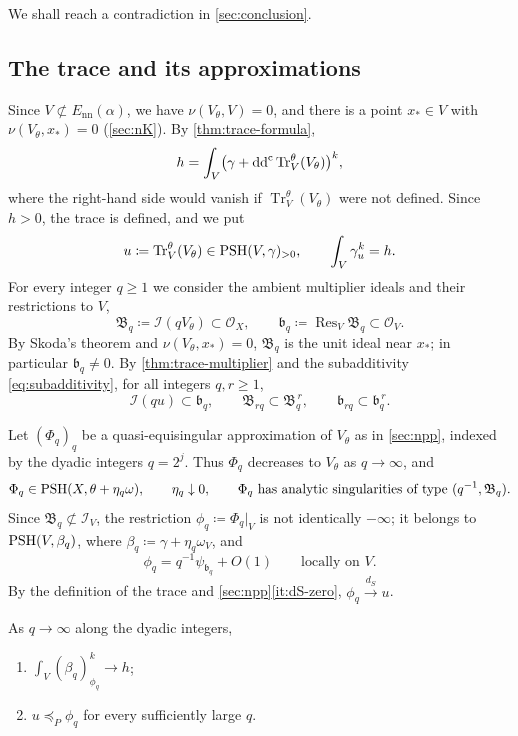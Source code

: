 \documentclass[11pt,a4paper]{amsart}
\newcommand{\Enn}{E_{\mathrm{nn}}}
\newcommand{\trc}{\operatorname{Tr}}            %
\newcommand{\dS}{d_{S}}                          %
\newcommand{\rest}[1]{\operatorname{Res}_{#1}}   %
\newcommand{\lessP}{\preceq_{P}}
\theoremstyle{definition}
\begin{document}
We shall reach a contradiction in \cref{sec:conclusion}.

\subsection{The trace and its approximations}\label{sec:trace-approx}

Since $V\not\subset\Enn(\alpha)$, we have $\nu(V_\theta,V)=0$, and there
is a point $x_*\in V$ with $\nu(V_\theta,x_*)=0$ (\cref{sec:nK}). By
\cref{thm:trace-formula},
\[
  h=\int_V\bigl(\gamma+\ddc\trc^\theta_V(V_\theta)\bigr)^k,
\]
where the right-hand side would vanish if $\trc^\theta_V(V_\theta)$ were
not defined. Since $h>0$, the trace is defined, and we put
\[
  u\coloneqq \trc^\theta_V(V_\theta)\in\PSH(V,\gamma)_{>0},
  \qquad\int_V\gamma_u^k=h .
\]
For every integer $q\ge1$ we consider the ambient multiplier ideals and
their restrictions to $V$,
\[
  \mathfrak B_q\coloneqq \mathcal I(qV_\theta)\subset\mathcal O_X,
  \qquad
  \mathfrak b_q\coloneqq \rest{V}\mathfrak B_q\subset\mathcal O_V .
\]
By Skoda's theorem and $\nu(V_\theta,x_*)=0$, $\mathfrak B_q$ is the unit
ideal near $x_*$; in particular $\mathfrak b_q\ne0$. By
\cref{thm:trace-multiplier} and the subadditivity
\eqref{eq:subadditivity}, for all integers $q,r\ge1$,
\begin{equation}\label{eq:trace-ideals}
  \mathcal I(qu)\subset\mathfrak b_q,
  \qquad
  \mathfrak B_{rq}\subset\mathfrak B_q^{\,r},
  \qquad
  \mathfrak b_{rq}\subset\mathfrak b_q^{\,r}.
\end{equation}

Let $(\Phi_q)_q$ be a quasi-equisingular approximation of $V_\theta$ as
in \cref{sec:npp}, indexed by the dyadic integers $q=2^j$. Thus $\Phi_q$
decreases to $V_\theta$ as $q\to\infty$, and
\[
  \Phi_q\in\mathrm{PSH}(X,\theta+\eta_q\omega),\qquad
  \eta_q\downarrow0,\qquad
  \Phi_q\ \text{has analytic singularities of type }(q^{-1},\mathfrak B_q).
\]
Since $\mathfrak B_q\not\subset\mathcal I_V$, the restriction
$\phi_q\coloneqq \Phi_q|_V$ is not identically $-\infty$; it belongs to
$\mathrm{PSH}(V,\beta_q)$, where $\beta_q\coloneqq \gamma+\eta_q\omega_V$, and
\begin{equation}\label{eq:phiq-singularities}
  \phi_q=q^{-1}\psi_{\mathfrak b_q}+O(1)\qquad\text{locally on }V.
\end{equation}
By the definition of the trace and \cref{sec:npp}\ref{it:dS-zero},
$\phi_q\xrightarrow{\dS}u$.

\begin{lemma}\label{lem:trace-approximants}
As $q\to\infty$ along the dyadic integers,
\begin{enumerate}[label=\textup{(\roman*)},leftmargin=*,itemsep=.2em,topsep=.3em]
\item\label{it:vq-mass} $\int_V(\beta_q)_{\phi_q}^k\to h$;
\item\label{it:vq-order} $u\lessP\phi_q$ for every sufficiently large $q$.
\end{enumerate}
\end{lemma}
\end{document}

